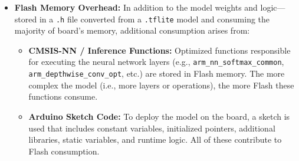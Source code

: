 \begin{itemize}
    \item \textbf{Flash Memory Overhead:} In addition to the model weights and logic—stored in a \texttt{.h} file converted from a \texttt{.tflite} model and consuming the majority of board's memory, additional consumption arises from:
    \begin{itemize}
        \item \textbf{CMSIS-NN / Inference Functions:} Optimized functions responsible for executing the neural network layers (e.g., \texttt{arm\_nn\_softmax\_common}, \texttt{arm\_depthwise\_conv\_opt}, etc.) are stored in Flash memory. The more complex the model (i.e., more layers or operations), the more Flash these functions consume.
        \item \textbf{Arduino Sketch Code:} To deploy the model on the board, a sketch is used that includes constant variables, initialized pointers, additional libraries, static variables, and runtime logic. All of these contribute to Flash consumption.
    \end{itemize}
\end{itemize}

\newpage


